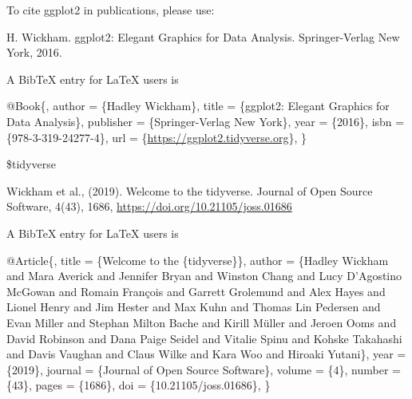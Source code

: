 \documentclass[
]{article}
\begin{document}
To cite ggplot2 in publications, please use:

H. Wickham. ggplot2: Elegant Graphics for Data Analysis. Springer-Verlag
New York, 2016.

A BibTeX entry for LaTeX users is

@Book\{, author = \{Hadley Wickham\}, title = \{ggplot2: Elegant
Graphics for Data Analysis\}, publisher = \{Springer-Verlag New York\},
year = \{2016\}, isbn = \{978-3-319-24277-4\}, url =
\{\url{https://ggplot2.tidyverse.org}\}, \}

\$tidyverse

Wickham et al., (2019). Welcome to the tidyverse. Journal of Open Source
Software, 4(43), 1686, \url{https://doi.org/10.21105/joss.01686}

A BibTeX entry for LaTeX users is

@Article\{, title = \{Welcome to the \{tidyverse\}\}, author = \{Hadley
Wickham and Mara Averick and Jennifer Bryan and Winston Chang and Lucy
D'Agostino McGowan and Romain François and Garrett Grolemund and Alex
Hayes and Lionel Henry and Jim Hester and Max Kuhn and Thomas Lin
Pedersen and Evan Miller and Stephan Milton Bache and Kirill Müller and
Jeroen Ooms and David Robinson and Dana Paige Seidel and Vitalie Spinu
and Kohske Takahashi and Davis Vaughan and Claus Wilke and Kara Woo and
Hiroaki Yutani\}, year = \{2019\}, journal = \{Journal of Open Source
Software\}, volume = \{4\}, number = \{43\}, pages = \{1686\}, doi =
\{10.21105/joss.01686\}, \}
\end{document}
